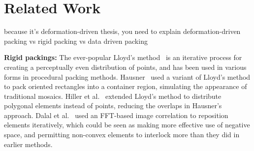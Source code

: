 
\chapter{Related Work}
\label{chapter_related_work}


\mynote
{
	because it's deformation-driven thesis, 
	you need to explain deformation-driven packing vs rigid packing vs data driven packing
}

\textbf{Rigid packings:}
The ever-popular Lloyd's method~\cite{McCool1992}
is an iterative
process for creating a perceptually even distribution of points, and has been
used in various forms in procedural packing methods.
Hausner~\cite{Hausner2001} 
used a variant of Lloyd's method to pack oriented rectangles into a container 
region, simulating the appearance of traditional mosaics.  
Hiller et al.~\cite{Hiller2003} extended Lloyd's method to distribute polygonal
elements instead of points, reducing the overlaps in Hausner's approach.
Dalal et al.~\cite{Dalal2006} used an FFT-based image correlation to reposition
elements iteratively, which could be seen as making more effective use of negative
space, and permitting non-convex elements to interlock more than they did in
earlier methods.


